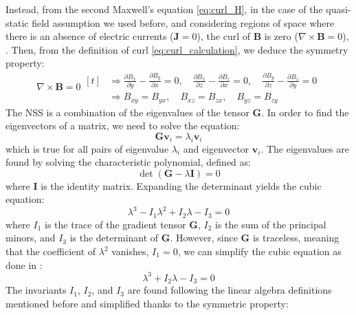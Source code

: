 Instead, from the second Maxwell's equation \eqref{eq:curl_H}, in the case
of the quasi-static field assumption we used before, and considering regions
of space where there is an absence of electric currents (\(\mathbf{J} = 0\)),
the curl of \(\mathbf{B}\) is zero (\(\nabla \times \mathbf{B} = 0\)), \cite{NSS_single_different_dimensions}.
Then, from the definition of curl \eqref{eq:curl_calculation}, we deduce the symmetry property:
\begin{equation}
    \nabla \times \mathbf{B} = 0
    \begin{aligned}[t]
        &\Rightarrow \frac{\partial B_x}{\partial y} - \frac{\partial B_y}{\partial x} = 0, \quad 
        \frac{\partial B_x}{\partial z} - \frac{\partial B_z}{\partial x} = 0, \quad 
        \frac{\partial B_y}{\partial z} - \frac{\partial B_z}{\partial y} = 0 \\
        &\Rightarrow B_{xy} = B_{yx}, \quad B_{xz} = B_{zx}, \quad B_{yz} = B_{zy}
\end{aligned}
\end{equation}
The NSS is a combination of the eigenvalues of the tensor \( \mathbf{G} \).
In order to find the eigenvectors of a matrix, we need to solve the equation:
\begin{equation}
\mathbf{G} \mathbf{v}_i = \lambda_i \mathbf{v}_i
\label{eq:eigen}
\end{equation}
which is true for all pairs of eigenvalue \( \lambda_i \) and eigenvector \( \mathbf{v}_i \).
The eigenvalues are found by solving the characteristic polynomial, defined as:
\begin{equation}
\det(\mathbf{G} - \lambda \mathbf{I}) = 0
\label{eq:characteristic}
\end{equation}
where \( \mathbf{I} \) is the identity matrix.
Expanding the determinant yields the cubic equation:
\begin{equation}
\lambda^3 - I_1 \lambda^2 + I_2 \lambda - I_3 = 0
\end{equation}
where \( I_1 \) is the trace of the gradient tensor \( \mathbf{G} \), 
\( I_2 \) is the sum of the principal minors, 
and \( I_3 \) is the determinant of \( \mathbf{G} \). 
However, since \( \mathbf{G} \) is traceless, meaning that the coefficient 
of \( \lambda^2 \) vanishes, \( I_1 = 0 \), we can simplify the cubic equation as done in
\cite{NSS_single_different_dimensions}:
\begin{equation}
\lambda^3 + I_2 \lambda - I_3 = 0
\end{equation}
The invariants \( I_1 \), \( I_2 \), and \( I_3 \) are found
following the linear algebra definitions mentioned before and simplified thanks to the symmetric property:
\\

